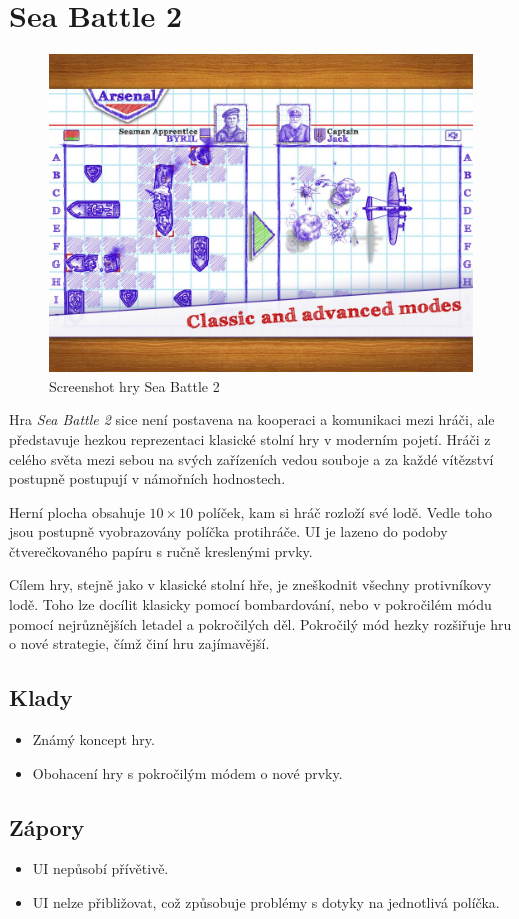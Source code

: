 \section{Sea Battle 2}

\begin{figure}
    \centering
    \includegraphics[width=0.5\linewidth]{assets/competitive-apps/sea-battle.jpg}
    \caption{Screenshot hry Sea Battle 2~\cite{byril_sea_battle_2}}
    \label{fig:sea-battle}
\end{figure}

Hra \emph{Sea Battle 2} sice není postavena na kooperaci a komunikaci mezi
hráči,
ale představuje hezkou reprezentaci klasické stolní hry v moderním pojetí.
Hráči z celého světa mezi sebou na svých zařízeních vedou souboje
a za každé vítězství postupně postupují v námořních
hodnostech.~\cite{byril_sea_battle_2}

Herní plocha obsahuje $10 \times 10$ políček,
kam si hráč rozloží své lodě.
Vedle toho jsou postupně vyobrazovány políčka protihráče.
UI je lazeno do podoby čtverečkovaného papíru s ručně kreslenými prvky.

Cílem hry, stejně jako v klasické stolní hře,
je zneškodnit všechny protivníkovy lodě.
Toho lze docílit klasicky pomocí bombardování,
nebo v pokročilém módu pomocí nejrůznějších letadel a pokročilých děl.
Pokročilý mód hezky rozšiřuje hru o nové strategie,
čímž činí hru zajímavější.

\subsection*{Klady}

\begin{itemize}
    \item Známý koncept hry.
    \item Obohacení hry s pokročilým módem o nové prvky.
\end{itemize}

\subsection*{Zápory}

\begin{itemize}
    \item UI nepůsobí přívětivě.
    \item UI nelze přibližovat,
    což způsobuje problémy s dotyky na jednotlivá políčka.
\end{itemize}
